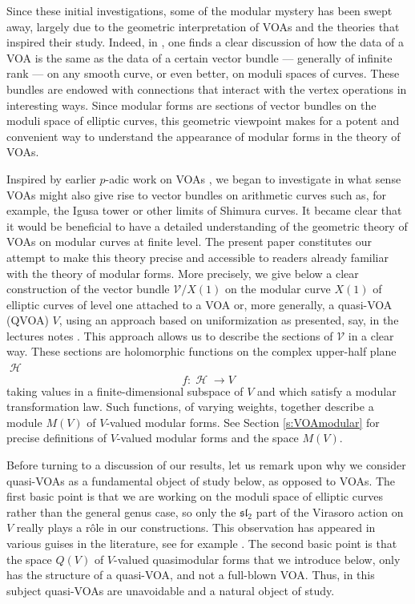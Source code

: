 \documentclass[12pt]{amsart}
\theoremstyle{plain}
\theoremstyle{definition}
\theoremstyle{remark}
\newcommand{\cV}{\mathcal{V}}
\DeclareMathOperator{\uhp}{\mathcal{H}}
\begin{document}
Since these initial investigations, some of the modular mystery has been swept away, largely due to the geometric interpretation of VOAs and the theories that inspired their study. Indeed, in \cite{FBZ}, one finds a clear discussion of how the data of a VOA is the same as the data of a certain vector bundle --- generally of infinite rank --- on any smooth curve, or even better, on moduli spaces of curves. These bundles are endowed with connections that interact with the vertex operations in interesting ways. Since modular forms are sections of vector bundles on the moduli space of elliptic curves, this geometric viewpoint makes for a potent and convenient way to understand the appearance of modular forms in the theory of VOAs.

Inspired by earlier $p$-adic work on VOAs \cite{FMpadic}, we began to investigate in what sense VOAs might also give rise to vector bundles on arithmetic curves such as, for example, the Igusa tower or other limits of Shimura curves. It became clear that it would be beneficial to have a detailed understanding of the geometric theory of VOAs on modular curves at finite level. The present paper constitutes our attempt to make this theory precise and accessible to readers already familiar with the theory of modular forms. More precisely, we give below a clear construction of the vector bundle $\cV/X(1)$ on the modular curve $X(1)$ of elliptic curves of level one attached to a VOA or, more generally, a quasi-VOA (QVOA) $V$, using an approach based on uniformization as presented, say, in the lectures notes \cite{Hain}. This approach allows us to describe the sections of $\cV$ in a clear way. These sections are holomorphic functions on the complex upper-half plane $\uhp$
\[
f\colon \uhp \to V
\]
taking values in a finite-dimensional subspace of $V$ and which satisfy a modular transformation law. Such functions, of varying weights, together describe a module $M(V)$ of $V$-valued modular forms. See Section \ref{s:VOAmodular} for precise definitions of $V$-valued modular forms and the space $M(V)$. 

Before turning to a discussion of our results, let us remark upon why we consider quasi-VOAs as a fundamental object of study below, as opposed to VOAs. The first basic point is that we are working on the moduli space of elliptic curves rather than the general genus case, so only the $\mathfrak{s}\mathfrak{l}_2$ part of the Virasoro action on $V$ really plays a r\^{o}le in our constructions. This observation has appeared in various guises in the literature, see for example \cite[Page 20]{FHL}. The second basic point is that the space $Q(V)$ of $V$-valued quasimodular forms that we introduce below, only has the structure of a quasi-VOA, and not a full-blown VOA. Thus, in this subject quasi-VOAs are unavoidable and a natural object of study.
\end{document}
